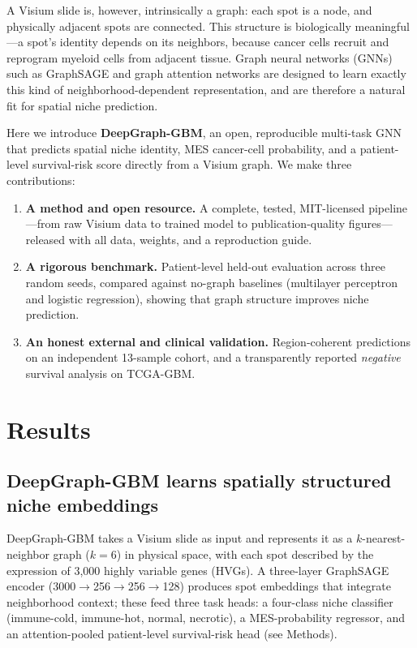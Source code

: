 \documentclass[11pt,letterpaper]{article}
\begin{document}
A Visium slide is, however, intrinsically a graph: each spot is a node, and physically adjacent spots are connected. This structure is biologically meaningful---a spot's identity depends on its neighbors, because cancer cells recruit and reprogram myeloid cells from adjacent tissue. Graph neural networks (GNNs) such as GraphSAGE \cite{hamilton2017} and graph attention networks \cite{velickovic2018} are designed to learn exactly this kind of neighborhood-dependent representation, and are therefore a natural fit for spatial niche prediction.

Here we introduce \textbf{DeepGraph-GBM}, an open, reproducible multi-task GNN that predicts spatial niche identity, MES cancer-cell probability, and a patient-level survival-risk score directly from a Visium graph. We make three contributions:
\begin{enumerate}
  \item \textbf{A method and open resource.} A complete, tested, MIT-licensed pipeline---from raw Visium data to trained model to publication-quality figures---released with all data, weights, and a reproduction guide.
  \item \textbf{A rigorous benchmark.} Patient-level held-out evaluation across three random seeds, compared against no-graph baselines (multilayer perceptron and logistic regression), showing that graph structure improves niche prediction.
  \item \textbf{An honest external and clinical validation.} Region-coherent predictions on an independent 13-sample cohort, and a transparently reported \emph{negative} survival analysis on TCGA-GBM.
\end{enumerate}

\section{Results}

\subsection{DeepGraph-GBM learns spatially structured niche embeddings}

DeepGraph-GBM takes a Visium slide as input and represents it as a $k$-nearest-neighbor graph ($k=6$) in physical space, with each spot described by the expression of 3{,}000 highly variable genes (HVGs). A three-layer GraphSAGE encoder (3000$\rightarrow$256$\rightarrow$256$\rightarrow$128) produces spot embeddings that integrate neighborhood context; these feed three task heads: a four-class niche classifier (immune-cold, immune-hot, normal, necrotic), a MES-probability regressor, and an attention-pooled patient-level survival-risk head (see Methods).
\end{document}
